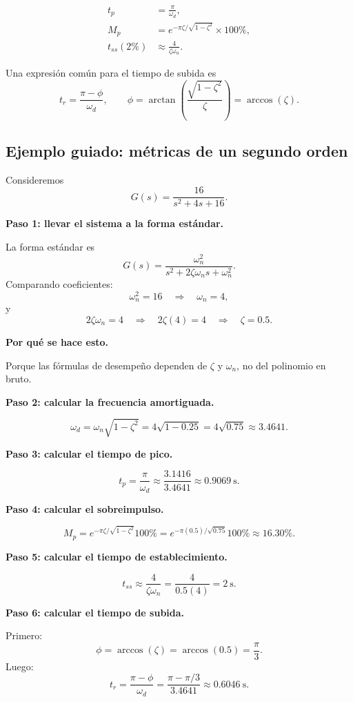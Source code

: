 \documentclass[11pt]{article}
\begin{document}
\begin{align}
t_p &= \frac{\pi}{\omega_d},\\
M_p &= e^{-\pi\zeta/\sqrt{1-\zeta^2}}\times 100\%,\\
t_{ss}(2\%) &\approx \frac{4}{\zeta\omega_n}.
\end{align}

Una expresi\'on com\'un para el tiempo de subida es
\begin{equation}
t_r=\frac{\pi-\phi}{\omega_d},
\qquad
\phi=\arctan\!\left(\frac{\sqrt{1-\zeta^2}}{\zeta}\right)=\arccos(\zeta).
\end{equation}

\subsection{Ejemplo guiado: m\'etricas de un segundo orden}
Consideremos
\[
G(s)=\frac{16}{s^2+4s+16}.
\]

\textbf{Paso 1: llevar el sistema a la forma est\'andar.}

La forma est\'andar es
\[
G(s)=\frac{\omega_n^2}{s^2+2\zeta\omega_n s+\omega_n^2}.
\]
Comparando coeficientes:
\[
\omega_n^2=16 \quad\Rightarrow\quad \omega_n=4,
\]
y
\[
2\zeta\omega_n=4
\quad\Rightarrow\quad
2\zeta(4)=4
\quad\Rightarrow\quad
\zeta=0.5.
\]

\textbf{Por qu\'e se hace esto.}

Porque las f\'ormulas de desempe\~no dependen de $\zeta$ y $\omega_n$, no del polinomio en bruto.

\textbf{Paso 2: calcular la frecuencia amortiguada.}

\[
\omega_d=\omega_n\sqrt{1-\zeta^2}
=4\sqrt{1-0.25}
=4\sqrt{0.75}
\approx 3.4641.
\]

\textbf{Paso 3: calcular el tiempo de pico.}

\[
t_p=\frac{\pi}{\omega_d}
\approx \frac{3.1416}{3.4641}
\approx 0.9069~\text{s}.
\]

\textbf{Paso 4: calcular el sobreimpulso.}

\[
M_p=e^{-\pi\zeta/\sqrt{1-\zeta^2}}100\%
=e^{-\pi(0.5)/\sqrt{0.75}}100\%
\approx 16.30\%.
\]

\textbf{Paso 5: calcular el tiempo de establecimiento.}

\[
t_{ss}\approx \frac{4}{\zeta\omega_n}
=\frac{4}{0.5(4)}
=2~\text{s}.
\]

\textbf{Paso 6: calcular el tiempo de subida.}

Primero:
\[
\phi=\arccos(\zeta)=\arccos(0.5)=\frac{\pi}{3}.
\]
Luego:
\[
t_r=\frac{\pi-\phi}{\omega_d}
=\frac{\pi-\pi/3}{3.4641}
\approx 0.6046~\text{s}.
\]
\end{document}
